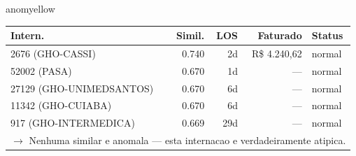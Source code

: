 \documentclass[a4paper,10pt]{article}
\begin{document}
\begin{anomalycard}[Internacao 166494 | GHO-PETROBRAS | MODERADO (z=2.42)]{anomyellow}
\begin{tabular}{l r r r l}\toprule\textbf{Intern.} & \textbf{Simil.} & \textbf{LOS} & \textbf{Faturado} & \textbf{Status} \\\midrule
2676 (GHO-CASSI) & 0.740 & 2d & R\$ 4.240,62 & \textcolor{jcubeblue}{normal} \\
52002 (PASA) & 0.670 & 1d & --- & \textcolor{jcubeblue}{normal} \\
27129 (GHO-UNIMEDSANTOS) & 0.670 & 6d & --- & \textcolor{jcubeblue}{normal} \\
11342 (GHO-CUIABA) & 0.670 & 6d & --- & \textcolor{jcubeblue}{normal} \\
917 (GHO-INTERMEDICA) & 0.669 & 29d & --- & \textcolor{jcubeblue}{normal} \\
\multicolumn{5}{l}{\textcolor{jcubeblue}{\small $\rightarrow$ Nenhuma similar e anomala --- esta internacao e verdadeiramente atipica.}} \\
\bottomrule\end{tabular}



\end{anomalycard}

\newpage
\end{document}
